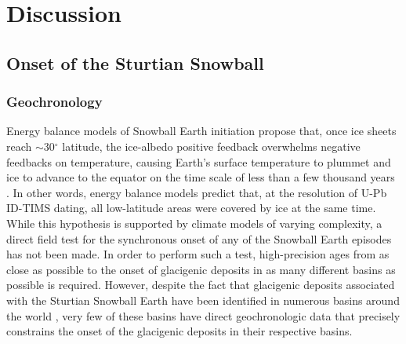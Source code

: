 \section{Discussion}

\subsection{Onset of the Sturtian Snowball}

\subsubsection{Geochronology}

Energy balance models of Snowball Earth initiation propose that, once ice sheets reach $\sim$30$^{\circ}$ latitude, the ice-albedo positive feedback overwhelms negative feedbacks on temperature, causing Earth's surface temperature to plummet and ice to advance to the equator on the time scale of less than a few thousand years \citep{Baum2001a, Hoffman2002a, Pollard2005a}. In other words, energy balance models predict that, at the resolution of U-Pb ID-TIMS dating, all low-latitude areas were covered by ice at the same time. While this hypothesis is supported by climate models of varying complexity, a direct field test for the synchronous onset of any of the Snowball Earth episodes has not been made. In order to perform such a test, high-precision ages from as close as possible to the onset of glacigenic deposits in as many different basins as possible is required. However, despite the fact that glacigenic deposits associated with the Sturtian Snowball Earth have been identified in numerous basins around the world \citep{Hoffman2009a}, very few of these basins have direct geochronologic data that precisely constrains the onset of the glacigenic deposits in their respective basins.

